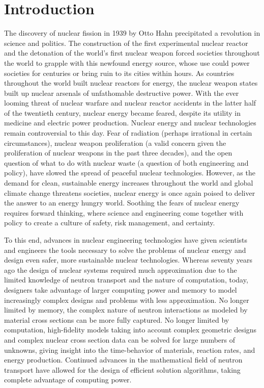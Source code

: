 \chapter{Introduction}

The discovery of nuclear fission in 1939 by Otto Hahn precipitated a revolution in science and politics. The construction of the first experimental nuclear reactor and the detonation of the world's first nuclear weapon forced societies throughout the world to grapple with this newfound energy source, whose use could power societies for centuries or bring ruin to its cities within hours. As countries throughout the world built nuclear reactors for energy, the nuclear weapon states built up nuclear arsenals of unfathomable destructive power. With the ever looming threat of nuclear warfare and nuclear reactor accidents in the latter half of the twentieth century, nuclear energy became feared, despite its utility in medicine and electric power production.  Nuclear energy and nuclear technologies remain controversial to this day. Fear of radiation (perhaps irrational in certain circumstances), nuclear weapon proliferation (a valid concern given the proliferation of nuclear weapons in the past three decades), and the open question of what to do with nuclear waste (a question of both engineering and policy), have slowed the spread of peaceful nuclear technologies. However, as the demand for clean, sustainable energy increases throughout the world and global climate change threatens societies, nuclear energy is once again poised to deliver the answer to an energy hungry world. Soothing the fears of nuclear energy requires forward thinking, where science and engineering come together with policy to create a culture of safety, risk management, and certainty. 

To this end, advances in nuclear engineering technologies have given scientists and engineers the tools necessary to solve the problems of nuclear energy and design even safer, more sustainable nuclear technologies. Whereas seventy years ago the design of nuclear systems required much approximation due to the limited knowledge of neutron transport and the nature of computation, today, designers take advantage of larger computing power and memory to model increasingly complex designs and problems with less approximation. No longer limited by memory, the complex nature of neutron interactions as modeled by material cross sections can be more fully captured. No longer limited by computation, high-fidelity models taking into account complex geometric designs and complex nuclear cross section data can be solved for large numbers of unknowns, giving insight into the time-behavior of materials, reaction rates, and energy production. Continued advances in the mathematical field of neutron transport have allowed for the design of efficient solution algorithms, taking complete advantage of computing power. 

